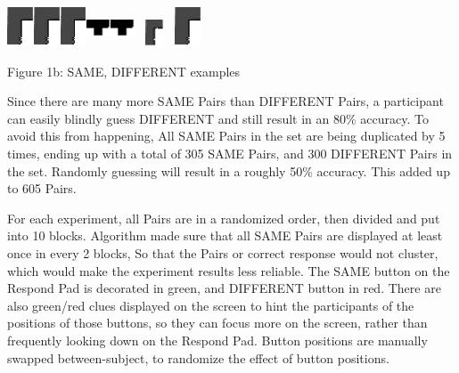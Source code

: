 \documentclass{article}
\begin{document}
	\noindent 
	
	\noindent \includegraphics*[width=0.31in, height=0.47in, keepaspectratio=false]{image8}\includegraphics*[width=0.31in, height=0.47in, keepaspectratio=false]{image9}\includegraphics*[width=0.31in, height=0.47in, keepaspectratio=false]{image10}\includegraphics*[width=0.28in, height=0.42in, keepaspectratio=false]{image11}\includegraphics*[width=0.28in, height=0.42in, keepaspectratio=false]{image12}\includegraphics*[width=0.47in, height=0.31in, keepaspectratio=false]{image13}\includegraphics*[width=0.31in, height=0.47in, keepaspectratio=false]{image14}
	
	\noindent \textbf{}
	
	\noindent Figure 1b: SAME, DIFFERENT examples
	
	\noindent Since there are many more SAME Pairs than DIFFERENT Pairs, a participant can easily blindly guess DIFFERENT and still result in an 80\% accuracy. To avoid this from happening, All SAME Pairs in the set are being duplicated by 5 times, ending up with a total of 305 SAME Pairs, and 300 DIFFERENT Pairs in the set. Randomly guessing will result in a roughly 50\% accuracy. This added up to 605 Pairs.
	
	\noindent For each experiment, all Pairs are in a randomized order, then divided and put into 10 blocks. Algorithm made sure that all SAME Pairs are displayed at least once in every 2 blocks, So that the Pairs or correct response would not cluster, which would make the experiment results less reliable. The SAME button on the Respond Pad is decorated in green, and DIFFERENT button in red. There are also green/red clues displayed on the screen to hint the participants of the positions of those buttons, so they can focus more on the screen, rather than frequently looking down on the Respond Pad. Button positions are manually swapped between-subject, to randomize the effect of button positions.
	
\end{document}
